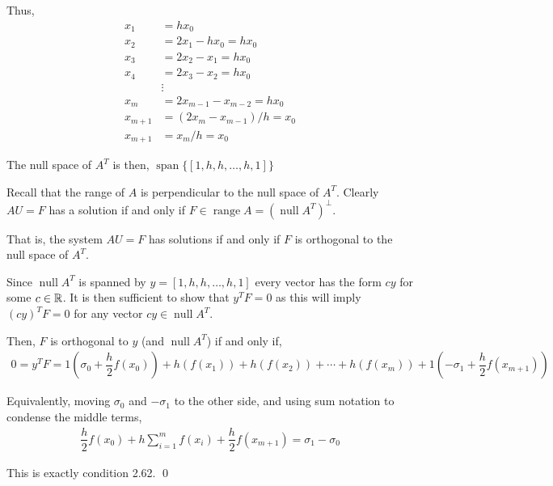 \documentclass[10pt]{article}
\begin{document}
\begin{solution}[Solution]
Thus,
\begin{align*}
    x_1 &= hx_0  \\
    x_2 &= 2x_1 - hx_0 = hx_0 \\
    x_3 &= 2x_2 - x_1 = hx_0 \\
    x_4 &= 2x_3 - x_2 = hx_0 \\
    &\vdots \\
    x_{m} &= 2x_{m-1}-x_{m-2} = hx_0 \\
    x_{m+1} &= (2x_m-x_{m-1})/h = x_0 \\
    x_{m+1} &= x_m/h = x_0
\end{align*}

The null space of \( A^T \) is then, \( \operatorname{span}\{[1,h,h,\ldots,h,1]\} \)

Recall that the range of \( A \) is perpendicular to the null space of \( A^T\). Clearly \( AU = F \) has a solution if and only if \( F\in\operatorname{range}A = (\operatorname{null}A^T)^\perp \).

That is, the system \( AU = F \) has solutions if and only if \( F \) is orthogonal to the null space of \( A^T \). 

Since \( \operatorname{null}A^T \) is spanned by \( y=[1,h,h,\ldots,h,1] \) every vector has the form \( cy \) for some \( c\in\mathbb{R} \). It is then sufficient to show that \( y^TF = 0 \) as this will imply \( (cy)^TF = 0 \) for any vector \( cy \in \operatorname{null}A^T \).

Then, \( F \) is orthogonal to \( y \) (and \( \operatorname{null}A^T \)) if and only if,
\begin{align*}
    0 = y^TF = 1\left(\sigma_0 + \dfrac{h}{2}f(x_0) \right) + h(f(x_1)) + h(f(x_2)) + \cdots +  h(f(x_m)) + 1 \left( -\sigma_1 + \dfrac{h}{2}f(x_{m+1})\right)
\end{align*}

Equivalently, moving \( \sigma_0 \) and \( -\sigma_1 \) to the other side, and using sum notation to condense the middle terms,
\begin{align*}
    \dfrac{h}{2}f(x_0) + h\sum_{i=1}^{m}f(x_i) + \dfrac{h}{2}f(x_{m+1}) = \sigma_1 - \sigma_0
\end{align*}

This is exactly condition 2.62. \qed

\end{solution}
\end{document}
